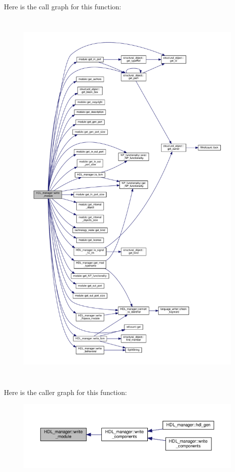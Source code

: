 Here is the call graph for this function\+:
\nopagebreak
\begin{figure}[H]
\begin{center}
\leavevmode
\includegraphics[height=550pt]{d7/d32/classHDL__manager_a0e67d86aca71fada08a10096cac3396a_cgraph}
\end{center}
\end{figure}
Here is the caller graph for this function\+:
\nopagebreak
\begin{figure}[H]
\begin{center}
\leavevmode
\includegraphics[width=350pt]{d7/d32/classHDL__manager_a0e67d86aca71fada08a10096cac3396a_icgraph}
\end{center}
\end{figure}


